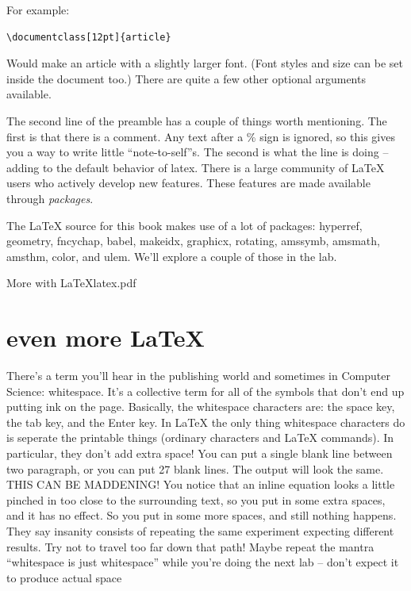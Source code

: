 For example:

\begin{codeblock}
\begin{verbatim}
\documentclass[12pt]{article}

\end{verbatim}
\end{codeblock}

Would make an article with a slightly larger font.  (Font styles and size can be set inside the document too.)  There are quite a few other optional arguments available.

The second line of the preamble has a couple of things worth mentioning.  The first is that there is a comment.  Any text after a \% sign is ignored, so this gives you a way to write little ``note-to-self''s.  The second is what the line is doing -- adding to the default behavior of latex.  There is a large community of \LaTeX{}   users who actively develop new features.  These features are made available through {\em packages}.  

The \LaTeX{}   source for this book makes use of a lot of packages: 
hyperref, geometry, fncychap, babel, makeidx, graphicx, rotating, amssymb, amsmath, amsthm, color, and ulem.  We'll explore a couple of those in the lab.


\clearpage
\begin{worksheet}{3}{More with \LaTeX}{latex.pdf}

\end{worksheet}
\clearpage

\section{even more LaTeX}
\label{sec:even_more_latex}

There's a term you'll hear in the publishing world and sometimes in Computer Science: whitespace.
It's a collective term for all of the symbols that don't end up putting ink on the page. Basically, the whitespace characters are: the space key, the tab key, and the Enter key.  In \LaTeX{}  the only thing whitespace characters do is seperate the printable things (ordinary characters and \LaTeX{}  commands).  In particular, they don't add extra space!  You can put a single blank line between two paragraph, or you can put 27 blank lines.  The output will look the same.  THIS CAN BE MADDENING!  You notice that an inline equation looks a little pinched in too close to the surrounding text, so you put in some extra spaces, and it has no effect.  So you put in some more spaces, and still nothing happens.  They say insanity consists of repeating the same experiment expecting different results.  Try not to travel too far down that path!  Maybe repeat the mantra ``whitespace is just whitespace'' while you're doing the next lab -- don't expect it to produce actual space\textellipsis

